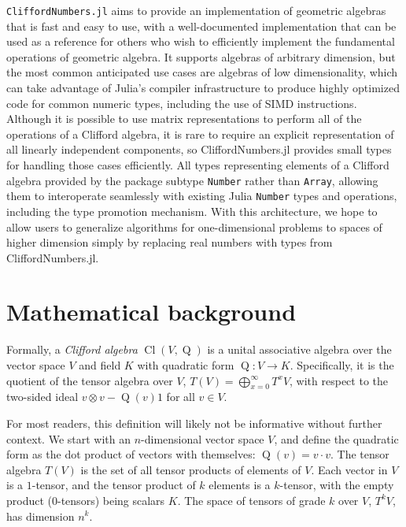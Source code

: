 \documentclass{juliacon}
\DeclareMathOperator{\Cl}{Cl}
\begin{document}
{\tt CliffordNumbers.jl} aims to provide an implementation of geometric algebras that is fast and easy to use, with a well-documented implementation that can be used as a reference for others who wish to efficiently implement the fundamental operations of geometric algebra. It supports algebras of arbitrary dimension, but the most common anticipated use cases are algebras of low dimensionality, which can take advantage of Julia's compiler infrastructure to produce highly optimized code for common numeric types, including the use of SIMD instructions.
Although it is possible to use matrix representations to perform all of the operations of a Clifford algebra, it is rare to require an explicit representation of all linearly independent components, so CliffordNumbers.jl provides small types for handling those cases efficiently. All types representing elements of a Clifford algebra provided by the package subtype \texttt{Number} rather than \texttt{Array}, allowing them to interoperate seamlessly with existing Julia \texttt{Number} types and operations, including the type promotion mechanism. With this architecture, we hope to allow users to generalize algorithms for one-dimensional problems to spaces of higher dimension simply by replacing real numbers with types from CliffordNumbers.jl.

\section{Mathematical background}

Formally, a \textit{Clifford algebra} $\Cl\left(V, \operatorname{Q}\right)$ is a unital associative algebra over the vector space $V$ and field $K$ with quadratic form $\operatorname{Q}: V \to K$. Specifically, it is the quotient of the tensor algebra over $V$, $T(V) = \bigoplus_{x = 0}^{\infty} T^x V$, with respect to the two-sided ideal $v \otimes v - \operatorname{Q}\left(v\right) 1$ for all $v \in V$. 

For most readers, this definition will likely not be informative without further context. We start with an $n$-dimensional vector space $V$, and define the quadratic form as the dot product of vectors with themselves: $\operatorname{Q}\left(v\right) = v \cdot v$. The tensor algebra $T(V)$ is the set of all tensor products of elements of $V$. Each vector in $V$ is a $1$-tensor, and the tensor product of $k$ elements is a $k$-tensor, with the empty product ($0$-tensors) being scalars $K$. The space of tensors of grade $k$ over $V$, $T^k V$, has dimension $n^k$.
\end{document}
